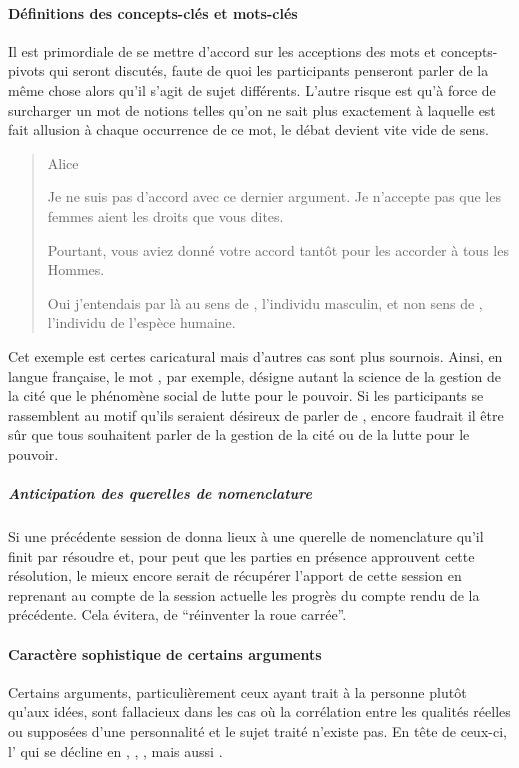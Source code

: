 \paragraph{Définitions des concepts-clés et mots-clés}
Il est primordiale de se mettre d’accord sur les acceptions des mots et concepts-pivots qui seront discutés, faute de quoi les participants penseront parler de la même chose alors qu’il s’agit de sujet différents. L’autre risque est qu’à force de surcharger un mot de notions telles qu’on ne sait plus exactement à laquelle est fait allusion à chaque occurrence de ce mot, le débat devient vite vide de sens.

\begin{quote}
  \begin{drama}{0cm}{0cm}{Alice}

    \Aspeaks Je ne suis pas d’accord avec ce dernier argument. Je n’accepte pas que les femmes aient les droits que vous dites.

    \Bspeaks Pourtant, vous aviez donné votre accord tantôt pour les accorder à tous les Hommes.

    \Aspeaks Oui j’entendais par là  au sens de , l’individu masculin, et non  sens de , l’individu de l’espèce humaine.

  \end{drama}
\end{quote}

Cet exemple est certes caricatural mais d’autres cas sont plus sournois. Ainsi, en langue française, le mot , par exemple, désigne autant la science de la gestion de la cité que le phénomène social de lutte pour le pouvoir. Si les participants se rassemblent au motif qu’ils seraient désireux de parler de , encore faudrait il être sûr que tous souhaitent parler de la gestion de la cité ou de la lutte pour le pouvoir.

\subparagraph{Anticipation des querelles de nomenclature}
Si une précédente session de \mainabbr{} donna lieux à une querelle de nomenclature qu’il finit par résoudre et, pour peut que les parties en présence approuvent cette résolution, le mieux encore serait de récupérer l’apport de cette session en reprenant au compte de la session actuelle les progrès du compte rendu de la précédente. Cela évitera, de \enquote{réinventer la roue carrée}.

\paragraph{Caractère sophistique de certains arguments}
Certains arguments, particulièrement ceux ayant trait à la personne plutôt qu’aux idées, sont fallacieux dans les cas où la corrélation entre les qualités réelles ou supposées d’une personnalité et le sujet traité n’existe pas. En tête de ceux-ci, l’ qui se décline en , , , mais aussi .

